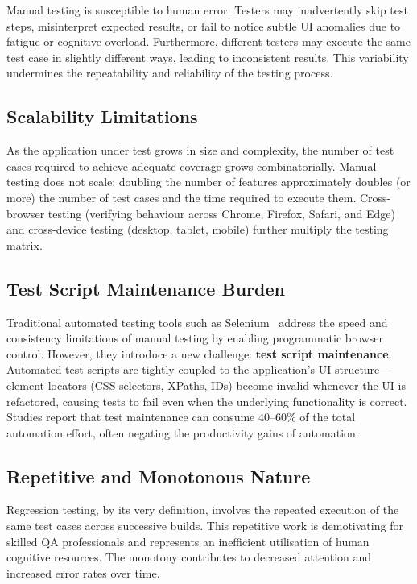 Manual testing is susceptible to human error. Testers may inadvertently skip test steps, misinterpret expected results, or fail to notice subtle UI anomalies due to fatigue or cognitive overload. Furthermore, different testers may execute the same test case in slightly different ways, leading to inconsistent results. This variability undermines the repeatability and reliability of the testing process.

\subsection{Scalability Limitations}
\label{subsec:scalability}

As the application under test grows in size and complexity, the number of test cases required to achieve adequate coverage grows combinatorially. Manual testing does not scale: doubling the number of features approximately doubles (or more) the number of test cases and the time required to execute them. Cross-browser testing (verifying behaviour across Chrome, Firefox, Safari, and Edge) and cross-device testing (desktop, tablet, mobile) further multiply the testing matrix.

\subsection{Test Script Maintenance Burden}
\label{subsec:maintenance}

Traditional automated testing tools such as Selenium~\cite{selenium2004} address the speed and consistency limitations of manual testing by enabling programmatic browser control. However, they introduce a new challenge: \textbf{test script maintenance}. Automated test scripts are tightly coupled to the application's UI structure---element locators (CSS selectors, XPaths, IDs) become invalid whenever the UI is refactored, causing tests to fail even when the underlying functionality is correct. Studies report that test maintenance can consume 40--60\% of the total automation effort, often negating the productivity gains of automation.

\subsection{Repetitive and Monotonous Nature}
\label{subsec:repetitive}

Regression testing, by its very definition, involves the repeated execution of the same test cases across successive builds. This repetitive work is demotivating for skilled QA professionals and represents an inefficient utilisation of human cognitive resources. The monotony contributes to decreased attention and increased error rates over time.

